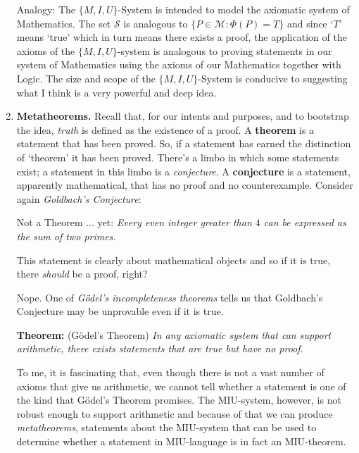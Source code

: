 \documentclass[10pt, AMS Euler]{article}
\begin{document}
\begin{enumerate}
\textsf{Analogy:} The $\{M,I,U\}$-System is intended to model the axiomatic system of Mathematics.  
The set $\mathcal{S}$ is analogous to $\{P \in \mathcal{M}: \Phi(P) = T\}$ and since `$T$' means `true' which in turn means 
there exists a proof, the application of the axioms of the $\{M,I,U\}$-system is analogous to proving statements in our 
system of Mathematics using the axioms of our Mathematics together with Logic.  The size and scope of the $\{M,I,U\}$-System is 
conducive to suggesting what I think is a very powerful and deep idea.  

\item {\bf Metatheorems.}  Recall that, for our intents and purposes, and to bootstrap the idea, \emph{truth} is defined
as the existence of a proof.  A {\bf theorem} is a statement that has been proved.  So, if a statement has earned the distinction
of `theorem' it has been proved.  There's a limbo in which some statements exist; a statement in this limbo is a \emph{conjecture}.
A {\bf conjecture} is a statement, apparently mathematical, that has no proof and no counterexample.  Consider again \emph{Goldbach's Conjecture}:

\textsf{Not a Theorem ... yet:} \emph{Every even integer greater than $4$ can be expressed as the sum of two primes.}

This statement is clearly about mathematical objects and so if it is true, there \emph{should} be a proof, right?

Nope.  One of \emph{G\"{o}del's incompleteness theorems} tells us that Goldbach's Conjecture may be unprovable even if it is true.

{\bf Theorem:} (G\"{o}del's Theorem) \emph{In any axiomatic system that can support arithmetic, there exists statements that are true
but have no proof.}

To me, it is fascinating that, even though there is not a vast number of axioms that give us arithmetic, we cannot tell whether a
statement is one of the kind that G\"{o}del's Theorem promises.
The MIU-system, however, is not robust enough to support arithmetic and because of that we can produce \emph{metatheorems}, statements
about the MIU-system that can be used to determine whether a statement in MIU-language is in fact an MIU-theorem.


\end{enumerate}
\end{document}
